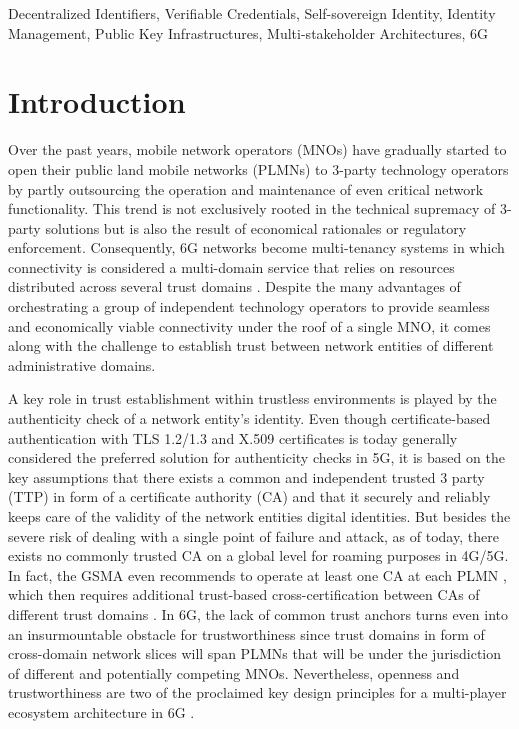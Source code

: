 \documentclass[conference]{IEEEtran}
\begin{document}
\begin{IEEEkeywords}
Decentralized Identifiers, Verifiable Credentials, Self-sovereign Identity, Identity Management, Public Key Infrastructures, Multi-stakeholder Architectures, 6G 
\end{IEEEkeywords}

\section{Introduction}

Over the past years, mobile network operators (MNOs) have gradually started to open their public land mobile networks (PLMNs) to 3-party technology operators by partly outsourcing the operation and maintenance of even critical network functionality. This trend is not exclusively rooted in the technical supremacy of 3-party solutions but is also the result of economical rationales or regulatory enforcement. Consequently, 6G networks become multi-tenancy systems \cite{An.2021} in which connectivity is considered a multi-domain service that relies on resources distributed across several trust domains \cite{Bertin.2021}. Despite the many advantages of orchestrating a group of independent technology operators to provide seamless and economically viable connectivity under the roof of a single MNO, it comes along with the challenge to establish trust between network entities of different administrative domains. 

A key role in trust establishment within trustless environments is played by the authenticity check of a network entity's identity. Even though certificate-based authentication with TLS 1.2/1.3 and X.509 certificates is today generally considered the preferred solution for authenticity checks in 5G, it is based on the key assumptions that there exists a common and independent trusted 3 party (TTP) in form of a certificate authority (CA) and that it securely and reliably keeps care of the validity of the network entities digital identities. But besides the severe risk of dealing with a single point of failure and attack, as of today, there exists no commonly trusted CA on a global level for roaming purposes in 4G/5G. In fact, the GSMA even recommends to operate at least one CA at each PLMN \cite{GSMAssociation.2021}, which then requires additional trust-based cross-certification between CAs of different trust domains \cite{EuropeanTelecommunicationsStandardsInstitute.2020}. In 6G, the lack of common trust anchors turns even into an insurmountable obstacle for trustworthiness since trust domains in form of cross-domain network slices will span PLMNs that will be under the jurisdiction of different and potentially competing MNOs. Nevertheless, openness and trustworthiness are two of the proclaimed key design principles for a multi-player ecosystem architecture in 6G \cite{Tong.2021}. 
\end{document}

